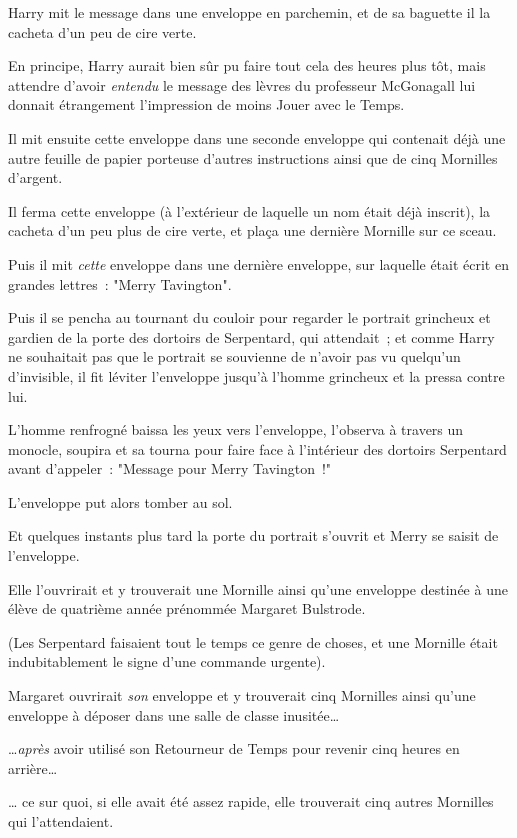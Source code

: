 Harry mit le message dans une enveloppe en parchemin, et de sa baguette il la cacheta d'un peu de cire verte.

En principe, Harry aurait bien sûr pu faire tout cela des heures plus tôt, mais attendre d'avoir \emph{entendu} le message des lèvres du professeur McGonagall lui donnait étrangement l'impression de moins Jouer avec le Temps.

Il mit ensuite cette enveloppe dans une seconde enveloppe qui contenait déjà une autre feuille de papier porteuse d'autres instructions ainsi que de cinq Mornilles d'argent.

Il ferma cette enveloppe (à l'extérieur de laquelle un nom était déjà inscrit), la cacheta d'un peu plus de cire verte, et plaça une dernière Mornille sur ce sceau.

Puis il mit \emph{cette} enveloppe dans une dernière enveloppe, sur laquelle était écrit en grandes lettres~: "Merry Tavington".

Puis il se pencha au tournant du couloir pour regarder le portrait grincheux et gardien de la porte des dortoirs de Serpentard, qui attendait~; et comme Harry ne souhaitait pas que le portrait se souvienne de n'avoir pas vu quelqu'un d'invisible, il fit léviter l'enveloppe jusqu'à l'homme grincheux et la pressa contre lui.

L'homme renfrogné baissa les yeux vers l'enveloppe, l'observa à travers un monocle, soupira et sa tourna pour faire face à l'intérieur des dortoirs Serpentard avant d'appeler~: "Message pour Merry Tavington~!"

L'enveloppe put alors tomber au sol.

Et quelques instants plus tard la porte du portrait s'ouvrit et Merry se saisit de l'enveloppe.

Elle l'ouvrirait et y trouverait une Mornille ainsi qu'une enveloppe destinée à une élève de quatrième année prénommée Margaret Bulstrode.

(Les Serpentard faisaient tout le temps ce genre de choses, et une Mornille était indubitablement le signe d'une commande urgente).

Margaret ouvrirait \emph{son} enveloppe et y trouverait cinq Mornilles ainsi qu'une enveloppe à déposer dans une salle de classe inusitée…

…\emph{après} avoir utilisé son Retourneur de Temps pour revenir cinq heures en arrière…

… ce sur quoi, si elle avait été assez rapide, elle trouverait cinq autres Mornilles qui l'attendaient.

